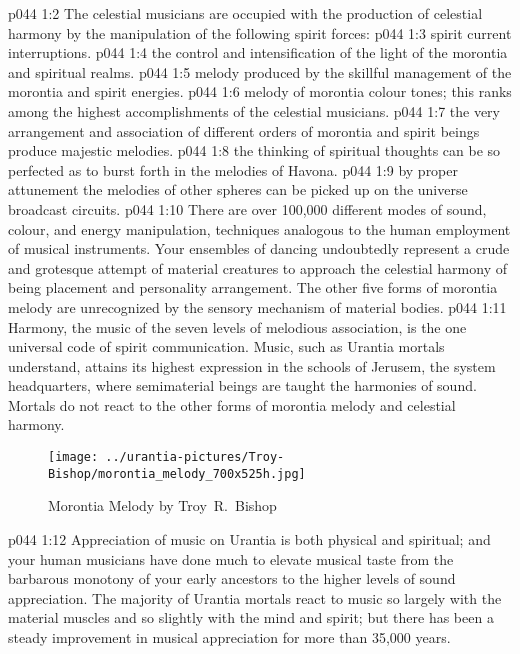 \vs p044 1:2 The celestial musicians are occupied with the production of celestial harmony by the manipulation of the following spirit forces:
\vs p044 1:3 \bibnobreakspace {} spirit current interruptions.
\vs p044 1:4 \bibnobreakspace {} the control and intensification of the light of the morontia and spiritual realms.
\vs p044 1:5 \bibnobreakspace {} melody produced by the skillful management of the morontia and spirit energies.
\vs p044 1:6 \bibnobreakspace {} melody of morontia colour tones; this ranks among the highest accomplishments of the celestial musicians.
\vs p044 1:7 \bibnobreakspace {} the very arrangement and association of different orders of morontia and spirit beings produce majestic melodies.
\vs p044 1:8 \bibnobreakspace {} the thinking of spiritual thoughts can be so perfected as to burst forth in the melodies of Havona.
\vs p044 1:9 \bibnobreakspace {} by proper attunement the melodies of other spheres can be picked up on the universe broadcast circuits.
\vs p044 1:10 \pc There are over 100,000 different modes of sound, colour, and energy manipulation, techniques analogous to the human employment of musical instruments. Your ensembles of dancing undoubtedly represent a crude and grotesque attempt of material creatures to approach the celestial harmony of being placement and personality arrangement. The other five forms of morontia melody are unrecognized by the sensory mechanism of material bodies.
\vs p044 1:11 Harmony, the music of the seven levels of melodious association, is the one universal code of spirit communication. Music, such as Urantia mortals understand, attains its highest expression in the schools of Jerusem, the system headquarters, where semimaterial beings are taught the harmonies of sound. Mortals do not react to the other forms of morontia melody and celestial harmony.
\begin{figure}[H]
\centering
\texttt{[image: ../urantia-pictures/Troy-Bishop/morontia\_melody\_700x525h.jpg]}
\caption{Morontia Melody by Troy~R.~Bishop}
\end{figure}
\vs p044 1:12 \pc Appreciation of music on Urantia is both physical and spiritual; and your human musicians have done much to elevate musical taste from the barbarous monotony of your early ancestors to the higher levels of sound appreciation. The majority of Urantia mortals react to music so largely with the material muscles and so slightly with the mind and spirit; but there has been a steady improvement in musical appreciation for more than 35,000 years.

